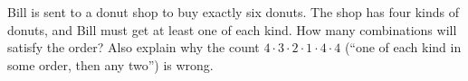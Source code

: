 Bill is sent to a donut shop to buy exactly six donuts. The shop has four kinds of donuts, and Bill must get at least one of each kind. How many combinations will satisfy the order? Also explain why the count $4\cdot3\cdot2\cdot1\cdot4\cdot4$ (``one of each kind in some order, then any two'') is wrong.
